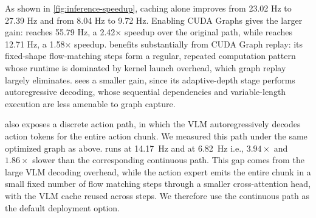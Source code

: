 As shown in \autoref{fig:inference-speedup}, caching alone improves \molmoactt from 23.02 Hz to 27.39 Hz and \molmothink from 8.04 Hz to 9.72 Hz. Enabling CUDA Graphs gives the larger gain: \molmoactt reaches 55.79 Hz, a 2.42\(\times\) speedup over the original path, while \molmothink reaches 12.71 Hz, a 1.58\(\times\) speedup. \molmoactt benefits substantially from CUDA Graph replay: its fixed-shape flow-matching steps form a regular, repeated computation pattern whose runtime is dominated by kernel launch overhead, which graph replay largely eliminates. \molmothink sees a smaller gain, since its adaptive-depth stage performs autoregressive decoding, whose sequential dependencies and variable-length execution are less amenable to graph capture.

\molmoactt also exposes a discrete action path, in which the VLM autoregressively decodes action tokens for the entire action chunk. We measured this path under the same optimized graph as above. \molmoactt runs at 14.17~Hz and \molmothink at 6.82~Hz i.e., \(3.94\times\) and \(1.86\times\) slower than the corresponding continuous path. This gap comes from the large VLM decoding overhead, while the action expert emits the entire chunk in a small fixed number of flow matching steps through a smaller cross-attention head, with the VLM cache reused across steps. We therefore use the continuous path as the default deployment option.
